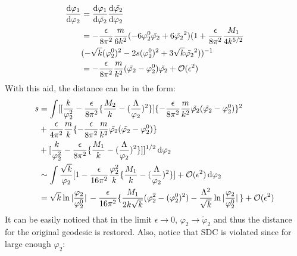 \begin{align} 
    \begin{split}
    \dv{\varphi_{1}}{\varphi_{2}} &= \dv{\varphi_{1}}{\tilde{\varphi_{2}}}\dv{\tilde{\varphi_{2}}}{\varphi_{2}}  \\
    &= -\frac{\epsilon}{8\pi^{2}}\frac{m}{6k^{2}} (-6\varphi_{2}^{0} \tilde{\varphi_{2}} + 6 \tilde{\varphi_{2}}^{2})(1+\frac{\epsilon}{8\pi^{2}} \frac{M_{1}}{4k^{5/2}} \\
    & (-\sqrt{k}(\varphi_{2}^{0} )^{2} - 2s(\varphi_{2}^{0}) ^{2} + 3\sqrt{k} \tilde{\varphi_{2}}^{2}))^{-1}  \\
    &= -\frac{\epsilon}{8\pi^{2}}\frac{m}{k^{2}} (\tilde{\varphi_{2}} - \varphi_{2}^{0})\tilde{\varphi_{2}} + \mathcal{O}(\epsilon ^{2})
    \end{split}
\end{align}
With this aid, the distance can be in the form:
\begin{align}
    \begin{split}
    s &=\int [[\frac{k}{\varphi_{2}^{2}} -\frac{\epsilon}{8\pi^{2}}\lbrace \frac{M_2}{k} - (\frac{\Lambda}{\varphi_{2}})^{2}\rbrace] \lbrace -\frac{\epsilon}{8\pi^{2}} \frac{m}{k^{2}} \tilde{\varphi_{2}}(\tilde{\varphi_{2}} -\varphi_{2}^{0}) \rbrace ^{2} \\
    & + \frac{\epsilon}{4\pi^{2}}\frac{m}{k}\lbrace -\frac{\epsilon}{8\pi^{2}} \frac{m}{k^{2}} \tilde{\varphi_{2}}(\tilde{\varphi_{2}} -\varphi_{2}^{0}) \rbrace  \\
    & + [\frac{k}{\varphi_{2}^{2}} -\frac{\epsilon}{8\pi^{2}}\lbrace \frac{M_1}{k} - (\frac{\Lambda}{\varphi_{2}})^{2}\rbrace]]^{1/2} \dd {\varphi_{2}}  \\
    &\sim \int \frac{\sqrt{k}}{\varphi_{2}} [1- \frac{\epsilon}{16\pi^{2}} \frac{\varphi_{2}^{2}}{k} \lbrace\frac{M_{1}}{k} - (\frac{\Lambda}{\varphi_{2}})^{2} \rbrace ] + \order*{\epsilon^{2}} \dd{\varphi_{2}} \\
    &= \sqrt{k} \ln\abs*{\frac{\varphi_{2}}{\varphi_{2}^{0}}} - \frac{\epsilon}{16\pi^{2}}\lbrace \frac{M_{1}}{2k\sqrt{k}}(\varphi_{2}^{2} - (\varphi_{2}^{0})^{2}) - \frac{\Lambda^{2}}{\sqrt{k}}\ln\abs*{\frac{\varphi_{2}}{\varphi_{2}^{0}}} \rbrace + \order*{\epsilon ^{2}}
    \end{split}
\end{align}
It can be easily noticed that in the limit $\epsilon \to 0$, $\varphi_{2} \to \tilde \varphi_{2}$ and thus the distance for the original geodesic is restored. Also, notice that SDC is violated since for large enough $\varphi_{2}$:
